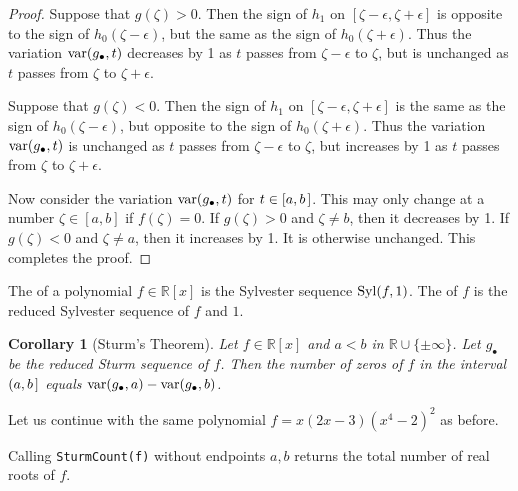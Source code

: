 \documentclass[12pt]{amsart}
\newtheorem{corollary}[theorem]{Corollary}
\theoremstyle{definition}
\newcommand{\RR}{\mathbb{R}}
\DeclareMathOperator{\var}{{\rm var}}
\DeclareMathOperator{\Syl}{{\rm Syl}}
\newcommand{\defcolor}[1]{{\color{TAMU}#1}}
\newcommand{\demph}[1]{\defcolor{{\sl #1}}}
\begin{document}
\begin{proof}
 Suppose that $g(\zeta)>0$.
 Then the sign of $h_1$ on $[\zeta-\epsilon,\zeta+\epsilon]$ is opposite to the sign of $h_0(\zeta-\epsilon)$, but the same as the sign of
 $h_0(\zeta+\epsilon)$.
 Thus the variation $\var(g_\bullet,t)$ decreases by 1 as $t$ passes from $\zeta{-}\epsilon$ to $\zeta$, but is unchanged as $t$
 passes from $\zeta$ to $\zeta{+}\epsilon$.
  

 Suppose that $g(\zeta)<0$.
 Then the sign of $h_1$ on $[\zeta-\epsilon,\zeta+\epsilon]$ is the same as the sign of $h_0(\zeta-\epsilon)$, but opposite to the sign of
 $h_0(\zeta+\epsilon)$.
 Thus the variation $\var(g_\bullet,t)$ is unchanged as $t$ passes from $\zeta-\epsilon$ to $\zeta$, but increases by 1 as $t$ 
 passes from $\zeta$ to $\zeta+\epsilon$.

 Now consider the variation $\var(g_\bullet,t)$ for $t\in[a,b\hspace{.05cm}]$.
 This may only change at a number $\zeta\in[a,b]$ if $f(\zeta)=0$.
 If $g(\zeta)>0$ and $\zeta\neq b$, then it decreases by 1.
 If $g(\zeta)<0$ and $\zeta\neq a$, then it increases by 1.
 It is otherwise unchanged.
 This completes the proof.
 \end{proof}

The \demph{Sturm sequence} of a polynomial $f\in\RR[x]$ is the Sylvester sequence $\Syl(f,1)$.
The \demph{reduced Sturm sequence} of $f$ is the reduced Sylvester sequence of $f$ and $1$.

\begin{corollary}[Sturm's Theorem]
  Let $f\in\RR[x]$ and $a<b$ in $\mathbb{R}\cup\{\pm\infty\}$.
  Let $g_\bullet$ be the reduced Sturm sequence of $f$.
  Then the number of zeros of $f$ in the interval $(a,b\hspace{.05cm}]$ equals  $\var(g_\bullet,a) - \var(g_\bullet,b)$.
\end{corollary}

Let us continue with the same polynomial $f=x(2x-3)(x^4-2)^2$ as before.
%
\begin{leftbar}

\end{leftbar}
%
Calling {\tt SturmCount(f)} without endpoints $a,b$ returns the total number of real roots of $f$.
\end{document}
